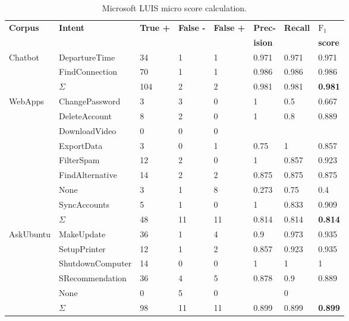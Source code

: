 \begin{table}[htbp]
    \centering
    \begin{tabular}{l l l l l l l l}
        \textbf{Corpus} & \textbf{Intent} & \textbf{True +} & \textbf{False -} & \textbf{False +} & \textbf{Prec-} & \textbf{Recall} & \textbf{$\text{F}_1$}\\
        & & & & & \textbf{ision} & & \textbf{score} \\
        \hline
        \multirow{3}{*}{Chatbot} & DepartureTime & 34 & 1 & 1 & 0.971 & 0.971 & 0.971 \\
        & FindConnection & 70 & 1 & 1 & 0.986 & 0.986 & 0.986 \\
        & $\Sigma$ & 104 & 2 & 2 & 0.981 & 0.981 & \textbf{0.981} \\
        \hline
        \multirow{9}{*}{WebApps} & ChangePassword & 3 & 3 & 0 & 1 & 0.5 & 0.667 \\
        & DeleteAccount & 8 & 2 & 0 & 1 & 0.8 & 0.889 \\
        & DownloadVideo & 0 & 0 & 0 & & &  \\
        & ExportData & 3 & 0 & 1 & 0.75 & 1 & 0.857 \\
        & FilterSpam & 12 & 2 & 0 & 1 & 0.857 & 0.923 \\
        & FindAlternative & 14 & 2 & 2 & 0.875 & 0.875 & 0.875 \\
        & None & 3 & 1 & 8 & 0.273 & 0.75 & 0.4  \\
        & SyncAccounts & 5 & 1 & 0 & 1 & 0.833 & 0.909 \\
        & $\Sigma$ & 48 & 11 & 11 & 0.814 & 0.814 & \textbf{0.814} \\
        \hline
        \multirow{6}{*}{AskUbuntu} & MakeUpdate & 36 & 1 & 4 & 0.9 & 0.973 & 0.935 \\
        & SetupPrinter & 12 & 1 & 2 & 0.857 & 0.923 & 0.935 \\
        & ShutdownComputer & 14 & 0 & 0 & 1 & 1 & 1 \\
        & SRecommendation & 36 & 4 & 5 & 0.878 & 0.9 & 0.889\\
        & None & 0 & 5 & 0 & & 0 & \\
        & $\Sigma$ & 98 & 11 & 11 & 0.899 & 0.899 & \textbf{0.899}\\
        \hline
    \end{tabular}
    \caption{Microsoft LUIS micro \fone score calculation.}
    \label{tab:recalculations_luis}
\end{table}
